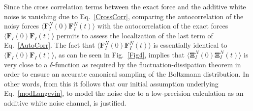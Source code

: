 \documentclass[format=acmsmall,review,timestamp,urlbreakonhyphens]{acmart}
\begin{document}
Since the cross correlation terms between the exact force and the additive white noise is vanishing due to Eq.~\ref{CrossCorr}, comparing the autocorrelation of the noisy forces $\langle \textbf{F}_{I}^{N}(0)\textbf{F}_{I}^{N}(t)\rangle$ with the autocorrelation of the exact forces $\langle \textbf{F}_{I}(0) \textbf{F}_{I}(t)\rangle$ permits to assess the localization of the last term of Eq.~\ref{AutoCorr}.
The fact that $\langle \textbf{F}_{I}^{N}(0)\textbf{F}_{I}^{N}(t)\rangle$ is essentially identical to $\langle \textbf{F}_{I}(0) \textbf{F}_{I}(t)\rangle$, as can be seen in Fig.~\ref{Fig4}, implies that $\langle \mathbf{\Xi } _{I}^{N}(0) \mathbf{\Xi } _{I}^{N}(t)\rangle$ is very close to a $\delta$-function as required by the fluctuation-dissipation theorem in order to ensure an accurate canonical sampling of the Boltzmann distribution. In other words, from this it follows that our initial assumption underlying Eq.~\ref{modLangevin}, to model the noise due to a low-precision calculation as an additive white noise channel, is justified.
\end{document}
